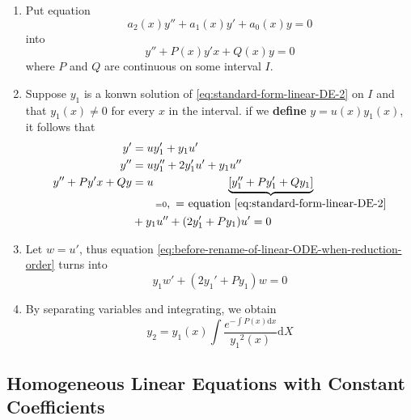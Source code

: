 \documentclass{beaulivre}
\begin{document}
\begin{enumerate}
    \item Put equation
        \[
            a_2(x)y'' + a_1(x) y' + a_0(x) y = 0
        \]
        into 
        \begin{equation}\label{eq:standard-form-linear-DE-2}
            y'' + P(x)y'x + Q(x)y = 0
        \end{equation}
        where $P$ and $Q$ are continuous on some interval $I$.
    \item Suppose $y_1$ is a konwn solution of \ref{eq:standard-form-linear-DE-2} on $I$
        and that $y_1(x) \neq 0$ for every $x$ in the interval.
        if we \textbf{define} $y = u(x)y_1(x)$, it follows that
        \begin{align}
            y'  &= u y'_1 + y_1 u' \notag\\
            y'' &= uy''_1 + 2y_1'u' + y_1 u'' \notag\\
            y'' + Py'x + Qy &= 
                u\underbrace{
                    \left[y_1'' + Py_1' + Qy_1\right]
                }_{
                    =0 \mbox{, \,= equation \ref{eq:standard-form-linear-DE-2}}
                }\notag\\
                &+ y_1u'' + (2y_1' + Py_1) u' = 0 \label{eq:before-rename-of-linear-ODE-when-reduction-order}
        \end{align}
    \item Let $w = u'$, thus equation \ref{eq:before-rename-of-linear-ODE-when-reduction-order} turns into
        \[
            y_1w' + (2y_1' + Py_1) w = 0
        \]
    \item By separating variables and integrating, we obtain
        \begin{equation}\label{eq:another-sln-reduction-order}
            y_2 = y_1(x) \int \dfrac{e^{-\int P(x) \mathrm{d}x}}{{y_1}^2 (x)} \mathrm{d}X
        \end{equation}
\end{enumerate}

\subsection{Homogeneous Linear Equations with Constant Coefficients}
\end{document}
